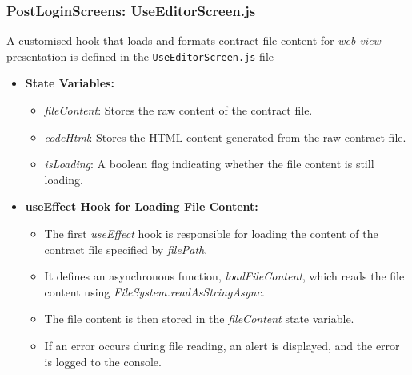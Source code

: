 \subsubsection{PostLoginScreens: UseEditorScreen.js}

A customised hook that loads and formats contract file content for \textit{web view} presentation is defined in the \texttt{UseEditorScreen.js} file

\begin{itemize}
    \item \textbf{State Variables:}
    \begin{itemize}
        \item \textit{fileContent}: Stores the raw content of the contract file.
        \item \textit{codeHtml}: Stores the HTML content generated from the raw contract file.
        \item \textit{isLoading}: A boolean flag indicating whether the file content is still loading.
    \end{itemize}

    \item \textbf{useEffect Hook for Loading File Content:}
    \begin{itemize}
        \item The first \textit{useEffect} hook is responsible for loading the content of the contract file specified by \textit{filePath}.
        \item It defines an asynchronous function, \textit{loadFileContent}, which reads the file content using \textit{FileSystem.readAsStringAsync}.
        \item The file content is then stored in the \textit{fileContent} state variable.
        \item If an error occurs during file reading, an alert is displayed, and the error is logged to the console.
    \end{itemize}


\end{itemize}
